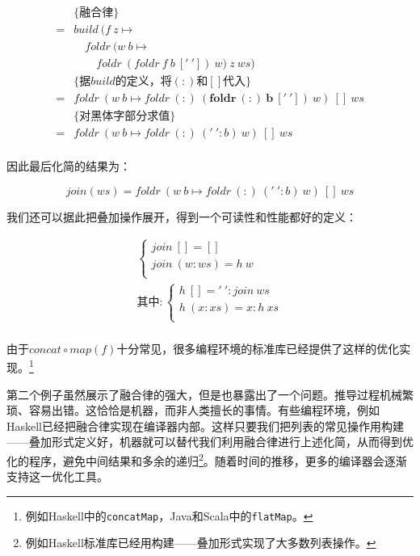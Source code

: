 \documentclass[b5paper]{ctexart}
\begin{document}
\begin{example}
\[\begin{array}{rl}
  & \{\text{融合律}\} \\
= & build\ (f\ z \mapsto \\
  & \quad foldr\ (w\ b \mapsto \\
  & \quad \quad foldr\ (foldr\ f\ b\ ['\ '])\ w)\ z\ ws) \\

  & \{\text{据$build$的定义，将$(:)$和$[]$代入}\} \\
= & foldr\ (w\ b \mapsto foldr\ (:)\ \pmb{(foldr\ (:)\ b\ ['\ '])}\ w)\ []\ ws \\

  & \{\text{对黑体字部分求值}\} \\
= & foldr\ (w\ b \mapsto foldr\ (:)\ ('\ ' : b)\ w)\ []\ ws \\
\end{array} \]

因此最后化简的结果为：

\[
join(ws) = foldr\ (w\ b \mapsto foldr\ (:)\ ('\ ' : b)\ w)\ []\ ws
\]

我们还可以据此把叠加操作展开，得到一个可读性和性能都好的定义：

\[
\begin{array}{l}
\begin{cases}
join\ [] = [] \\
join\ (w:ws) = h\ w \\
\end{cases} \\
\text{其中}: \begin{cases}
             h\ [] = '\ ' : join\ ws \\
             h\ (x:xs) = x : h\ xs \\
             \end{cases} \\
\end{array}
\]

 
由于$concat \circ map(f)$十分常见，很多编程环境的标准库已经提供了这样的优化实现。\footnote{例如Haskell中的\texttt{concatMap}，Java和Scala中的\texttt{flatMap}。}
\end{example}

第二个例子虽然展示了融合律的强大，但是也暴露出了一个问题。推导过程机械繁琐、容易出错。这恰恰是机器，而非人类擅长的事情。有些编程环境，例如Haskell已经把融合律实现在编译器内部\cite{GLPJ-1993}。这样只要我们把列表的常见操作用构建——叠加形式定义好，机器就可以替代我们利用融合律进行上述化简，从而得到优化的程序，避免中间结果和多余的递归\footnote{例如Haskell标准库已经用构建——叠加形式实现了大多数列表操作。}。随着时间的推移，更多的编译器会逐渐支持这一优化工具。
\end{document}
